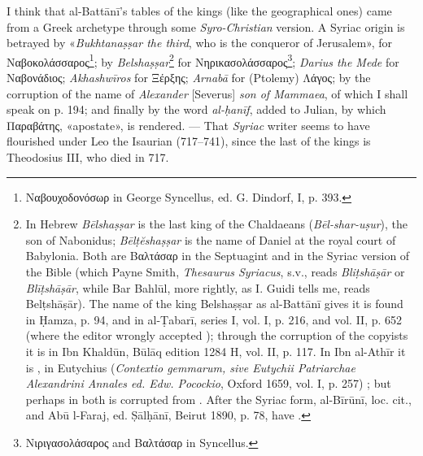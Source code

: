 \documentclass[11pt]{article}
\begin{document}
\par I think that al-Battānī's tables of the kings (like the geographical ones) came from a Greek archetype through some \emph{Syro-Christian} version. A Syriac origin is betrayed by «\emph{Bukhtanaṣṣar the third}, who is the conqueror of Jerusalem», for {\greekfont Ναβοκολάσσαρος}\footnote{{\greekfont Ναβουχοδονόσωρ} in George Syncellus, ed. G. Dindorf, I, p. 393.}; by \emph{Belshaṣṣar}\footnote{In Hebrew \emph{Bēlshaṣṣar}  is the last king of the Chaldaeans (\emph{Bēl-shar-uṣur}), the son of Nabonidus; \emph{Bēlṭĕshaṣṣar}  is the name of Daniel at the royal court of Babylonia. Both are {\greekfont Βαλτάσαρ} in the Septuagint and  in the Syriac version of the Bible (which Payne Smith, \emph{Thesaurus Syriacus}, s.v., reads \emph{Bliṭshāṣār} or \emph{Blīṭshāṣār}, while Bar Bahlūl, more rightly, as I. Guidi tells me, reads Belṭshāṣār). The name of the king Belshaṣṣar as al-Battānī gives it is found in Ḥamza, p. 94, and in al-Ṭabarī, series I, vol. I, p. 216, and vol. II, p. 652 (where the editor wrongly accepted ); through the corruption of the copyists it is  in Ibn Khaldūn, Būlāq edition 1284 H, vol. II, p. 117. In Ibn al-Athīr it is , in Eutychius (\emph{Contextio gemmarum, sive Eutychii Patriarchae Alexandrini Annales ed. Edw. Pocockio}, Oxford 1659, vol. I, p. 257) ; but perhaps in both  is corrupted from . After the Syriac form, al-Bīrūnī, loc. cit., and Abū l-Faraj, ed. Ṣālḥānī, Beirut 1890, p. 78, have .} for {\greekfont Νηρικασολάσσαρος}\footnote{{\greekfont Νιριγασολάσαρος} and {\greekfont Βαλτάσαρ} in Syncellus.}; \emph{Darius the Mede} for {\greekfont Ναβονάδιος}; \emph{Akhashwīros} for {\greekfont Ξέρξης}; \emph{Arnabā} for (Ptolemy) {\greekfont Λάγος}; by the corruption of the name of \emph{Alexander} [Severus] \emph{son of Mammaea}, of which I shall speak on p. 194; and finally by the word \emph{al-ḥanīf}, added to Julian, by which {\greekfont Παραβάτης}, «apostate», is rendered. — That \emph{Syriac} writer seems to have flourished under Leo the Isaurian (717–741), since the last of the kings is Theodosius III, who died in 717.\par
\end{document}
